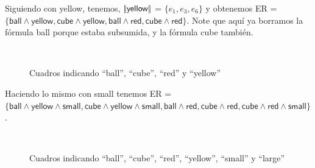 Siguiendo con \textsf{yellow}, tenemos, $|\!|\textsf{yellow}|\!|$ = $\{e_1, e_3, e_6\}$ y obtenemos ER = $\{\textsf{ball} \wedge \textsf{yellow}, \textsf{cube} \wedge \textsf{yellow}, \textsf{ball} \wedge \textsf{red}, \textsf{cube} \wedge \textsf{red}\}$. 
Note que aqu\'i ya borramos la f\'ormula \textsf{ball} porque estaba subsumida, y la f\'ormula \textsf{cube} tambi\'en.

\begin{figure}[ht]
\begin{center}
\\[0pt]
\caption{Cuadros indicando ``ball'', ``cube'', ``red'' y ``yellow''}
\label{fig-modelo10}
\end{center}
\end{figure}

Haciendo lo mismo con \textsf{small} tenemos ER = $\{\textsf{ball} \wedge \textsf{yellow} \wedge \textsf{small}, \textsf{cube} \wedge \textsf{yellow} \wedge \textsf{small}, \textsf{ball} \wedge \textsf{red}, \textsf{cube} \wedge \textsf{red}, \textsf{cube} \wedge \textsf{red} \wedge \textsf{small}\}$. 
\begin{figure}[ht]
\begin{center}
\\[0pt]
\caption{Cuadros indicando ``ball'', ``cube'', ``red'', ``yellow'', ``small'' y ``large''}
\label{fig-modelo11}
\end{center}
\end{figure}

